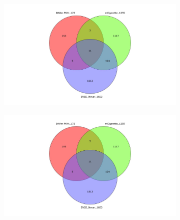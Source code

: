 \documentclass{article} %
\begin{document}
\begin{figure}[p]
    \centering
    \begin{subfigure}{0.49\linewidth}
        \centering
        \includegraphics[width=\linewidth, trim=7cm 0cm 7cm 0cm, clip]{venn_diagrams/intersect_compare_never.jpg}
    \end{subfigure}
    \hfill
    \begin{subfigure}{0.49\linewidth}
        \centering
        \includegraphics[width=\linewidth, trim=7cm 0cm 7cm 0cm, clip]{venn_diagrams/intersect_compare_never.jpg}
    \end{subfigure}


\end{figure}
\end{document}
